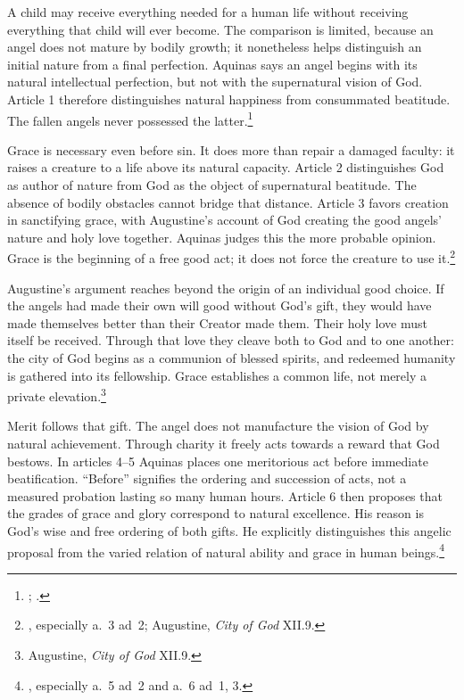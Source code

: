 A child may receive everything needed for a human life without receiving everything that child will ever become. The comparison is limited, because an angel does not mature by bodily growth; it nonetheless helps distinguish an initial nature from a final perfection. Aquinas says an angel begins with its natural intellectual perfection, but not with the supernatural vision of God. Article 1 therefore distinguishes natural happiness from consummated beatitude. The fallen angels never possessed the latter.\footnote{; .}

Grace is necessary even before sin. It does more than repair a damaged faculty: it raises a creature to a life above its natural capacity. Article 2 distinguishes God as author of nature from God as the object of supernatural beatitude. The absence of bodily obstacles cannot bridge that distance. Article 3 favors creation in sanctifying grace, with Augustine's account of God creating the good angels' nature and holy love together. Aquinas judges this the more probable opinion. Grace is the beginning of a free good act; it does not force the creature to use it.\footnote{, especially a.~3 ad~2; Augustine, \emph{City of God} XII.9.}

Augustine's argument reaches beyond the origin of an individual good choice. If the angels had made their own will good without God's gift, they would have made themselves better than their Creator made them. Their holy love must itself be received. Through that love they cleave both to God and to one another: the city of God begins as a communion of blessed spirits, and redeemed humanity is gathered into its fellowship. Grace establishes a common life, not merely a private elevation.\footnote{Augustine, \emph{City of God} XII.9.}

Merit follows that gift. The angel does not manufacture the vision of God by natural achievement. Through charity it freely acts towards a reward that God bestows. In articles 4--5 Aquinas places one meritorious act before immediate beatification. ``Before'' signifies the ordering and succession of acts, not a measured probation lasting so many human hours. Article 6 then proposes that the grades of grace and glory correspond to natural excellence. His reason is God's wise and free ordering of both gifts. He explicitly distinguishes this angelic proposal from the varied relation of natural ability and grace in human beings.\footnote{, especially a.~5 ad~2 and a.~6 ad~1, 3.}

